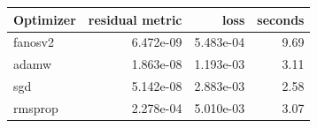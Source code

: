 \begin{tabular}{lrrr}
\toprule
Optimizer & residual metric & loss & seconds \\
\midrule
fanosv2 & 6.472e-09 & 5.483e-04 & 9.69 \\
adamw & 1.863e-08 & 1.193e-03 & 3.11 \\
sgd & 5.142e-08 & 2.883e-03 & 2.58 \\
rmsprop & 2.278e-04 & 5.010e-03 & 3.07 \\
\bottomrule
\end{tabular}
